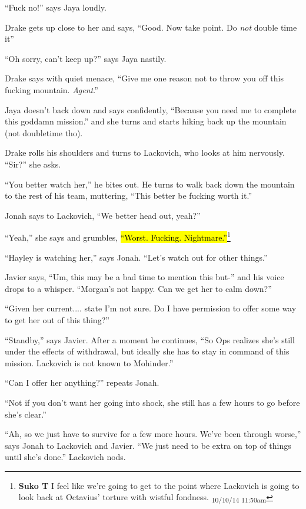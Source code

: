 ``Fuck no!'' says Jaya loudly.

Drake gets up close to her and says, ``Good.  Now take point.  Do \textit{not} double time it''

``Oh sorry, can't keep up?'' says Jaya nastily.

Drake says with quiet menace, ``Give me one reason not to throw you off this fucking mountain.  \textit{Agent}.''

Jaya doesn't back down and says confidently, ``Because you need me to complete this goddamn mission.'' and she turns and starts hiking back up the mountain (not doubletime tho).

Drake rolls his shoulders and turns to Lackovich, who looks at him nervously.  ``Sir?'' she asks.

``You better watch her,'' he bites out.  He turns to walk back down the mountain to the rest of his team, muttering, ``This better be fucking worth it.''

Jonah says to Lackovich, ``We better head out, yeah?''

``Yeah,'' she says and grumbles, \hl{``Worst.  Fucking.  Nightmare.''}\footnote{\textbf{Suko T }I feel like we're going to get to the point where Lackovich is going to look back at Octavius' torture with wistful fondness. \textsubscript{10/10/14 11:50am}}

``Hayley is watching her,'' says Jonah.  ``Let's watch out for other things.''

Javier says, ``Um, this may be a bad time to mention this but-'' and his voice drops to a whisper. ``Morgan's not happy.  Can we get her to calm down?''

``Given her current.... state I'm not sure.  Do I have permission to offer some way to get her out of this thing?''

``Standby,'' says Javier.  After a moment he continues, ``So Ops realizes she's still under the effects of withdrawal, but ideally she has to stay in command of this mission.  Lackovich is not known to Mohinder.''

``Can I offer her anything?'' repeats Jonah.

``Not if you don't want her going into shock, she still has a few hours to go before she's clear.''

``Ah, so we just have to survive for a few more hours.  We've been through worse,'' says Jonah to Lackovich and Javier.  ``We just need to be extra on top of things until she's done.''  Lackovich nods.




